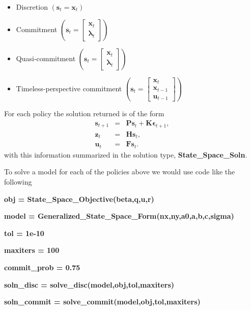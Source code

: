\documentclass[thmsa,notitlepage,11pt]{article}
\begin{document}
\begin{itemize}
\item Discretion $\left( \mathbf{s}_{t}=\mathbf{x}_{t}\right) $

\item Commitment $\left( \mathbf{s}_{t}=\left[ 
\begin{array}{c}
\mathbf{x}_{t} \\ 
\mathbf{\lambda }_{t}%
\end{array}%
\right] \right) $

\item Quasi-commitment $\left( \mathbf{s}_{t}=\left[ 
\begin{array}{c}
\mathbf{x}_{t} \\ 
\mathbf{\lambda }_{t}%
\end{array}%
\right] \right) $

\item Timeless-perspective commitment $\left( \mathbf{s}_{t}=\left[ 
\begin{array}{c}
\mathbf{x}_{t} \\ 
\mathbf{x}_{t-1} \\ 
\mathbf{u}_{t-1}%
\end{array}%
\right] \right) $
\end{itemize}

For each policy the solution returned is of the form%
\begin{eqnarray*}
\mathbf{s}_{t+1} &=&\mathbf{Ps}_{t}+\mathbf{K\epsilon }_{t+1}, \\
\mathbf{z}_{t} &=&\mathbf{Hs}_{t}, \\
\mathbf{u}_{t} &=&\mathbf{Fs}_{t}.
\end{eqnarray*}%
with this information summarized in the solution type, \textbf{%
State\_Space\_Soln}.

To solve a model for each of the policies above we would use code like the
following

\bigskip 

\textbf{obj = State\_Space\_Objective(beta,q,u,r)}

\textbf{model = Generalized\_State\_Space\_Form(nx,ny,a0,a,b,c,sigma)}

\textbf{tol = 1e-10}

\textbf{maxiters = 100}

\textbf{commit\_prob = 0.75}

\textbf{soln\_disc = solve\_disc(model,obj,tol,maxiters)}

\textbf{soln\_commit = solve\_commit(model,obj,tol,maxiters)}
\end{document}

